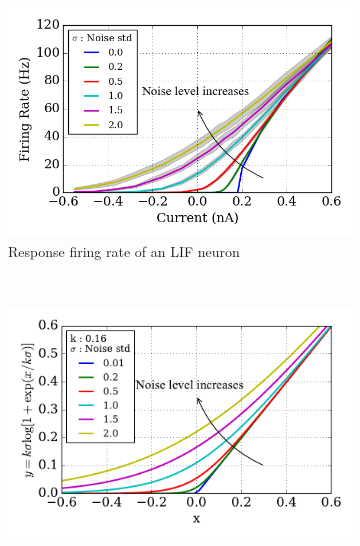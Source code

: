 \DIFdelendFL \DIFaddbeginFL \begin{figure}[bht!]
		\DIFaddendFL \centering
		\DIFdelbeginFL %
\DIFdelendFL \DIFaddbeginFL \begin{subfigure}[t]{0.7\textwidth}
			\includegraphics[width=\textwidth]{pics_iconip/revise_siegert.png}
			\DIFaddendFL \caption{Response firing rate of an LIF neuron}
		\end{subfigure}\DIFdelbeginFL %
\DIFdelendFL \DIFaddbeginFL \\
		\begin{subfigure}[t]{0.7\textwidth}
			\includegraphics[width=\textwidth]{pics_iconip/revise_4.pdf}

\end{subfigure}
\end{figure}
